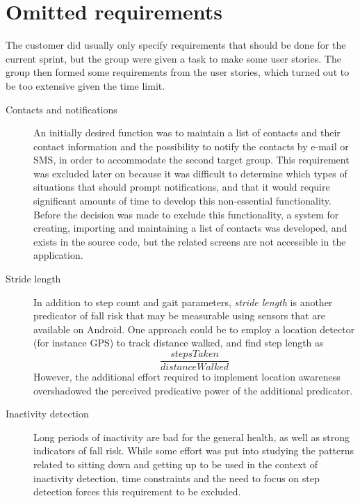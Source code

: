 \section{Omitted requirements} \label{expert_meeting_requirement}
The customer did usually only specify requirements that should be done for the current sprint, but the group were given a task to make some user stories. The group then formed some requirements from the user stories, which turned out to be too extensive given the time limit.

\begin{description} 
\item[Contacts and notifications] An initially desired function was to maintain a list of contacts and their contact information and the possibility to notify the contacts by e-mail or SMS, in order to accommodate the second target group. This requirement was excluded later on because it was difficult to determine which types of situations that should prompt notifications, and that it would require significant amounts of time to develop this non-essential functionality. Before the decision was made to exclude this functionality, a system for creating, importing and maintaining a list of contacts was developed, and exists in the source code, but the related screens are not accessible in the application.
\item[Stride length] In addition to step count and gait parameters, \emph{stride length} is another predicator of fall risk that may be measurable using sensors that are available on Android. One approach could be to employ a location detector (for instance GPS) to track distance walked, and find step length as $$\frac{stepsTaken}{distanceWalked}$$However, the additional effort required to implement location awareness overshadowed the perceived predicative power of the additional predicator.
\item[Inactivity detection] Long periods of inactivity are bad for the general health, as well as strong indicators of fall risk. While some effort was put into studying the patterns related to sitting down and getting up to be used in the context of inactivity detection, time constraints and the need to focus on step detection forces this requirement to be excluded. 
\end{description} 


